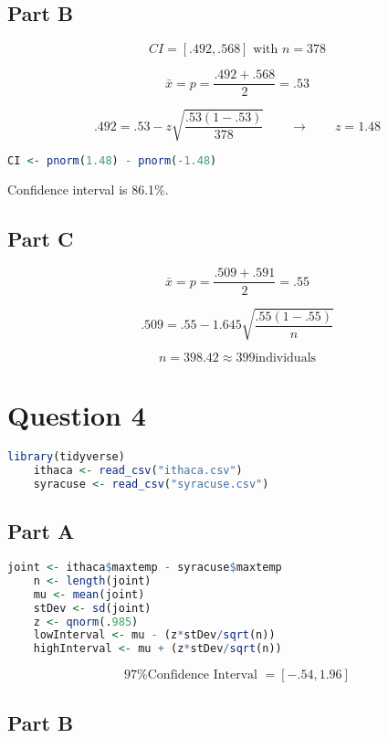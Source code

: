 \documentclass[letterpaper]{article}
\begin{document}
\subsection*{Part B}

$$CI = [.492, .568] \text{ with } n = 378$$

$$\bar{x} = p = \frac{.492 + .568}{2} = .53$$

$$.492 = .53 - z \sqrt{\frac{.53(1-.53)}{378}} \qquad \longrightarrow \qquad z = 1.48$$

\begin{lstlisting}[language=R]
    CI <- pnorm(1.48) - pnorm(-1.48)
\end{lstlisting}

Confidence interval is 86.1\%.

\subsection*{Part C}

$$\bar{x} = p = \frac{.509 + .591}{2} = .55$$

$$.509 = .55 - 1.645 \sqrt{\frac{.55(1-.55)}{n}}$$

$$n = 398.42 \approx 399 \text{individuals}$$

\newpage

\section*{Question 4}

\begin{lstlisting}[language=R]
    library(tidyverse)
    ithaca <- read_csv("ithaca.csv")
    syracuse <- read_csv("syracuse.csv")
\end{lstlisting}

\subsection*{Part A}

\begin{lstlisting}[language=R]
    joint <- ithaca$maxtemp - syracuse$maxtemp
    n <- length(joint)
    mu <- mean(joint)
    stDev <- sd(joint)
    z <- qnorm(.985)
    lowInterval <- mu - (z*stDev/sqrt(n))
    highInterval <- mu + (z*stDev/sqrt(n))
\end{lstlisting}

$$\text{97\% Confidence Interval } = [-.54, 1.96]$$

\subsection*{Part B}
\end{document}
